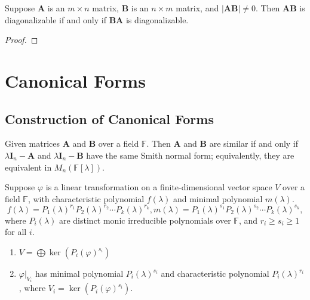 \documentclass[12pt, a4paper, oneside]{book}
\begin{document}
\begin{question}
    Suppose $\mathbf{A}$ is an $m\times n$ matrix, $\mathbf{B}$ is an $n\times m$ matrix, and $\left|\mathbf{A}\mathbf{B}\right| \neq 0$. Then $\mathbf{A}\mathbf{B}$ is diagonalizable if and only if $\mathbf{B}\mathbf{A}$ is diagonalizable.
    \begin{proof}

    \end{proof}
\end{question}



\chapter{Canonical Forms}
\section{Construction of Canonical Forms}
\begin{theorem}
    Given matrices $\mathbf{A}$ and $\mathbf{B}$ over a field $\mathbb{F}$.
    Then $\mathbf{A}$ and $\mathbf{B}$ are similar if and only if $\lambda \mathbf{I}_n - \mathbf{A}$ and $\lambda \mathbf{I}_n - \mathbf{B}$ have the same Smith normal form; equivalently, they are equivalent in $M_n(\mathbb{F}[\lambda])$.
\end{theorem}


\begin{proposition}
    Suppose $\varphi $ is a linear transformation on a finite-dimensional vector space $V$ over a field $\mathbb{F}$, with characteristic polynomial $f(\lambda)$ and minimal polynomial $m(\lambda)$.
    \begin{equation*}
        f(\lambda) = P_1(\lambda)^{r_1} P_2(\lambda)^{r_2} \cdots P_k(\lambda)^{r_k}, m(\lambda) = P_1(\lambda)^{s_1} P_2(\lambda)^{s_2} \cdots P_k(\lambda)^{s_k},
    \end{equation*}
    where $P_i(\lambda)$ are distinct monic irreducible polynomials over $\mathbb{F}$, and $r_i \geq s_i \geq 1$ for all $i$.
    \begin{enumerate}
        \item $V=\bigoplus \ker (P_i(\varphi)^{s_i})$
        \item $\left.\varphi\right|_{V_i}$ has minimal polynomial $P_i(\lambda)^{s_i}$ and characteristic polynomial $P_i(\lambda)^{r_i}$, where $V_i = \ker (P_i(\varphi)^{s_i})$.
    \end{enumerate}
\end{proposition}
\end{document}
